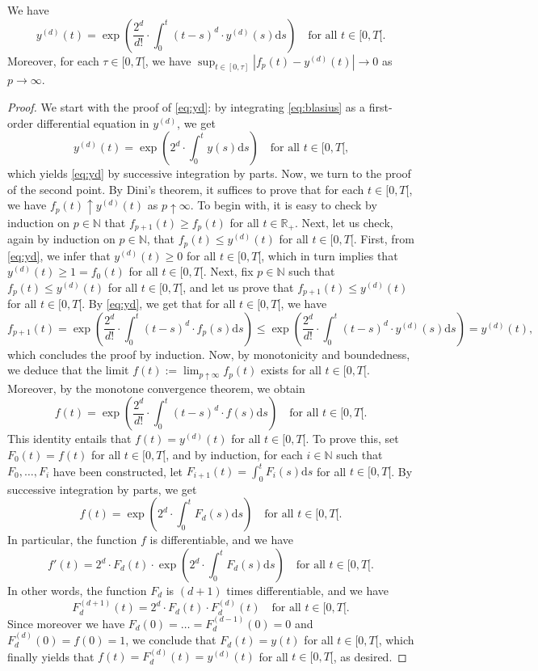 \documentclass[a4paper,11pt]{article}
\begin{document}
\begin{claim}\label{claim:picard}
We have
\begin{equation}\label{eq:yd}
y^{(d)}(t)=\exp\left(\frac{2^d}{d!}\cdot\int_0^t(t-s)^d\cdot y^{(d)}(s)\mathrm{d}s\right)\quad\text{for all $t\in[0,T[$.}
\end{equation}
Moreover, for each $\tau\in[0,T[$, we have $\sup_{t\in[0,\tau]}\left|f_p(t)-y^{(d)}(t)\right|\rightarrow0$ as $p\to\infty$.
\end{claim}
\begin{proof}
We start with the proof of \eqref{eq:yd}: by integrating \eqref{eq:blasius} as a first-order differential equation in $y^{(d)}$, we get
\[y^{(d)}(t)=\exp\left(2^d\cdot\int_0^ty(s)\mathrm{d}s\right)\quad\text{for all $t\in[0,T[$,}\]
which yields \eqref{eq:yd} by successive integration by parts.
Now, we turn to the proof of the second point.
By Dini's theorem, it suffices to prove that for each $t\in[0,T[$, we have $f_p(t)\uparrow y^{(d)}(t)$ as $p\uparrow\infty$.
To begin with, it is easy to check by induction on $p\in\mathbb{N}$ that $f_{p+1}(t)\geq f_p(t)$ for all $t\in\mathbb{R}_+$.
Next, let us check, again by induction on $p\in\mathbb{N}$, that $f_p(t)\leq y^{(d)}(t)$ for all $t\in[0,T[$.
First, from \eqref{eq:yd}, we infer that $y^{(d)}(t)\geq0$ for all $t\in[0,T[$, which in turn implies that $y^{(d)}(t)\geq1=f_0(t)$ for all $t\in[0,T[$.
Next, fix $p\in\mathbb{N}$ such that $f_p(t)\leq y^{(d)}(t)$ for all $t\in[0,T[$, and let us prove that $f_{p+1}(t)\leq y^{(d)}(t)$ for all $t\in[0,T[$.
By \eqref{eq:yd}, we get that for all $t\in[0,T[$, we have
\[f_{p+1}(t)=\exp\left(\frac{2^d}{d!}\cdot\int_0^t(t-s)^d\cdot f_p(s)\mathrm{d}s\right)\leq\exp\left(\frac{2^d}{d!}\cdot\int_0^t(t-s)^d\cdot y^{(d)}(s)\mathrm{d}s\right)=y^{(d)}(t),\]
which concludes the proof by induction.
Now, by monotonicity and boundedness, we deduce that the limit ${f(t):=\lim_{p\uparrow\infty}f_p(t)}$ exists for all $t\in[0,T[$.
Moreover, by the monotone convergence theorem, we obtain
\[f(t)=\exp\left(\frac{2^d}{d!}\cdot\int_0^t(t-s)^d\cdot f(s)\mathrm{d}s\right)\quad\text{for all $t\in[0,T[$.}\]
This identity entails that $f(t)=y^{(d)}(t)$ for all $t\in[0,T[$.
To prove this, set $F_0(t)=f(t)$ for all $t\in[0,T[$, and by induction, for each $i\in\mathbb{N}$ such that $F_0,\ldots,F_i$ have been constructed, let $F_{i+1}(t)=\int_0^tF_i(s)\mathrm{d}s$ for all $t\in[0,T[$.
By successive integration by parts, we get
\[f(t)=\exp\left(2^d\cdot\int_0^tF_d(s)\mathrm{d}s\right)\quad\text{for all $t\in[0,T[$.}\]
In particular, the function $f$ is differentiable, and we have
\[f'(t)=2^d\cdot F_d(t)\cdot\exp\left(2^d\cdot\int_0^tF_d(s)\mathrm{d}s\right)\quad\text{for all $t\in[0,T[$.}\]
In other words, the function $F_d$ is $(d+1)$ times differentiable, and we have
\[F_d^{(d+1)}(t)=2^d\cdot F_d(t)\cdot F_d^{(d)}(t)\quad\text{for all $t\in[0,T[$.}\]
Since moreover we have $F_d(0)=\ldots=F_d^{(d-1)}(0)=0$ and $F_d^{(d)}(0)=f(0)=1$, we conclude that $F_d(t)=y(t)$ for all $t\in[0,T[$, which finally yields that $f(t)=F_d^{(d)}(t)=y^{(d)}(t)$ for all $t\in[0,T[$, as desired.
\end{proof}
\end{document}
